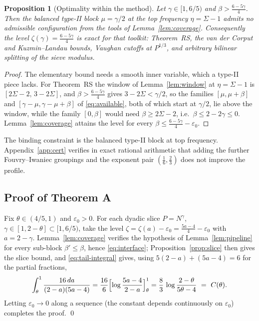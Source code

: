 \documentclass[11pt]{article}
\newtheorem{proposition}[theorem]{Proposition}
\theoremstyle{remark}
\newcommand{\N}{N}
\begin{document}
\begin{proposition}[Optimality within the method]\label{prop:optimal}
Let $\gamma\in[1,6/5)$ and $\beta>\frac{6-5\gamma}{4}$. Then the balanced type-II
block $\mu=\gamma/2$ at the top frequency $\eta=\Sigma-1$ admits no admissible
configuration from the tools of Lemma~\ref{lem:coverage}. Consequently the level
$\zeta(\gamma)=\frac{6-5\gamma}{4}$ is exact for that toolkit: Theorem~RS, the
van der Corput and Kuzmin--Landau bounds, Vaughan cutoffs at $P^{1/3}$, and
arbitrary bilinear splitting of the sieve modulus.
\end{proposition}

\begin{proof}
The elementary bound needs a smooth inner variable, which a type-II piece lacks. For
Theorem~RS the window of Lemma~\ref{lem:window} at $\eta=\Sigma-1$ is
$[2\Sigma-2,\,3-2\Sigma]$, and $\beta>\frac{6-5\gamma}{4}$ gives $3-2\Sigma<\gamma/2$,
so the families $[\mu,\mu+\beta]$ and $[\gamma-\mu,\gamma-\mu+\beta]$ of
\eqref{eq:available}, both of which start at $\gamma/2$, lie above the window, while
the family $[0,\beta]$ would need $\beta\ge 2\Sigma-2$, i.e.\ $\beta\le 2-2\gamma\le 0$.
Lemma~\ref{lem:coverage} attains the level for every
$\beta\le\frac{6-5\gamma}{4}-\varepsilon_0$.
\end{proof}

The binding constraint is the balanced type-II block at top frequency. Appendix~\ref{app:cert} verifies in exact rational arithmetic that adding the further Fouvry--Iwaniec groupings and the exponent pair $(\tfrac16,\tfrac23)$ does not improve the profile.

\subsection{Proof of Theorem A}\label{sec:expsums-assemble}

Fix $\theta\in(4/5,1)$ and $\varepsilon_0>0$. For each dyadic slice
$P=\N^{\gamma}$, $\gamma\in[1,2-\theta]\subset[1,6/5)$, take the level
$\zeta=\zeta(a)-\varepsilon_0=\frac{5a-4}{4}-\varepsilon_0$ with $a=2-\gamma$.
Lemma~\ref{lem:coverage} verifies the hypothesis of Lemma~\ref{lem:pipeline} for
every sub-block $\beta'\le\beta$, hence \eqref{eq:interface};
Proposition~\ref{prop:slice} then gives the slice bound,
and \eqref{eq:tail-integral} gives, using
$5(2-a)+(5a-4)=6$ for the partial fractions,
\[
\int_{\theta}^{1}\frac{16\,da}{(2-a)(5a-4)}
=\frac{16}{6}\Bigl[\log\frac{5a-4}{2-a}\Bigr]_{\theta}^{1}
=\frac83\,\log\frac{2-\theta}{5\theta-4}\ =\ C(\theta).
\]
Letting $\varepsilon_0\to0$ along a sequence (the constant depends continuously on
$\varepsilon_0$) completes the proof. \qed
\end{document}
